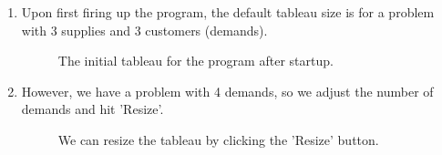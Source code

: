 \documentclass[a4paper,12pt]{article}
\begin{document}
\begin{enumerate}
\item
Upon first firing up the program, the default tableau size is for a problem with 3 supplies and 3 customers (demands).

\begin{figure}[h!]
\centering
{}
\caption{The initial tableau for the program after startup.}
\end{figure}

\newpage

\item
However, we have a problem with 4 demands, so we adjust the number of demands and hit 'Resize'.

\begin{figure}[h!]
\centering
{}
\caption{We can resize the tableau by clicking the 'Resize' button.}
\end{figure}


\end{enumerate}
\end{document}
